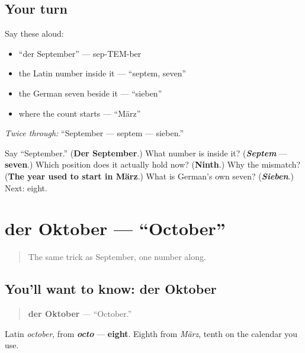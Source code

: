\subsection*{Your turn}
Say these aloud:

\begin{itemize}
\raggedright
  \item \textquotedblleft{}der September\textquotedblright{} — sep-TEM-ber
  \item the Latin number inside it — \textquotedblleft{}septem, seven\textquotedblright{}
  \item the German seven beside it — \textquotedblleft{}sieben\textquotedblright{}
  \item where the count starts — \textquotedblleft{}März\textquotedblright{}
\end{itemize}

\emph{Twice through:} \textquotedblleft{}September — septem — sieben.\textquotedblright{}

\begin{tcolorbox}[breakable,colback=teal!4,colframe=teal!35!black,title={Before you move on}]
Say \textquotedblleft{}September.\textquotedblright{} (\textbf{Der September}.) What number is inside it? (\emph{\textbf{Septem}} — \textbf{seven}.) Which position does it actually hold now? (\textbf{Ninth}.) Why the mismatch? (\textbf{The year used to start in März}.) What is German's own seven? (\emph{\textbf{Sieben}}.) Next: eight.
\end{tcolorbox}
\section[der Oktober]{der Oktober — \textquotedblleft{}October\textquotedblright{}}

\label{lesson:GE-C09-oktober}



\begin{quote}
The same trick as September, one number along.
\end{quote}

\subsection*{You'll want to know: der Oktober}
\begin{quote}
\textbf{der Oktober} — \textquotedblleft{}October.\textquotedblright{}
\end{quote}

Latin \emph{october}, from \emph{\textbf{octo}} — \textbf{eight}. Eighth from \emph{März}, tenth on the calendar you use.

